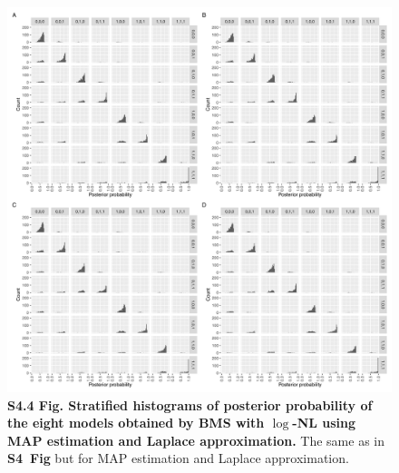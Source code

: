 \documentclass[11pt]{article}
\newcommand{\sfighistmcmcnl}{\textbf{S4~Fig}\xspace}
\begin{document}
\begin{figure}[!ht]
\begin{center}
  \includegraphics[width=1\textwidth]{png/sim_hist_map_lap_nl.png}
\end{center}  
\caption{
  {\bf
    S4.4 Fig.
    Stratified histograms of posterior probability of the eight models obtained by BMS with $\log$-NL using MAP estimation and Laplace approximation.}
The same as in \sfighistmcmcnl but for MAP estimation and Laplace approximation.
}
\label{s-fig:sim-hist-map-nl}
\end{figure}
\end{document}
